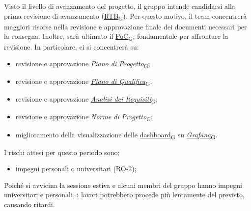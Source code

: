 Visto il livello di avanzamento del progetto, il gruppo intende candidarsi alla prima revisione di avanzamento (\href{https://7last.github.io/docs/pb/documentazione-interna/glossario\#requirements-and-technology-baseline}{RTB\textsubscript{G}}). Per questo motivo, il team concentrerà maggiori risorse nella revisione e approvazione finale dei documenti necessari per la consegna. Inoltre, sarà ultimato il \href{https://7last.github.io/docs/pb/documentazione-interna/glossario\#proof-of-concept}{PoC\textsubscript{G}}, fondamentale per affrontare la revisione. In particolare, ci si concentrerà su:
\begin{itemize}
	\item revisione e approvazione \href{https://7last.github.io/docs/pb/documentazione-interna/glossario\#piano-di-progetto}{\textit{Piano di Progetto}\textsubscript{G}};
	\item revisione e approvazione \href{https://7last.github.io/docs/pb/documentazione-interna/glossario\#piano-di-qualifica}{\textit{Piano di Qualifica}\textsubscript{G}};
	\item revisione e approvazione \href{https://7last.github.io/docs/pb/documentazione-interna/glossario\#analisi-dei-requisiti}{\textit{Analisi dei Requisiti}\textsubscript{G}};
	\item revisione e approvazione \href{https://7last.github.io/docs/pb/documentazione-interna/glossario\#norme-di-progetto}{\textit{Norme di Progetto}\textsubscript{G}};
	\item miglioramento della visualizzazione delle \href{https://7last.github.io/docs/pb/documentazione-interna/glossario\#dashboard}{dashboard\textsubscript{G}} su \href{https://7last.github.io/docs/pb/documentazione-interna/glossario\#grafana}{\textit{Grafana}\textsubscript{G}}.
\end{itemize}

\newpage

I rischi attesi per questo periodo sono:
\begin{itemize}
    \item impegni personali o universitari (RO-2);
\end{itemize}
Poiché si avvicina la sessione estiva e alcuni membri del gruppo hanno impegni universitari e personali, i lavori potrebbero procede più lentamente del previsto, causando ritardi.

